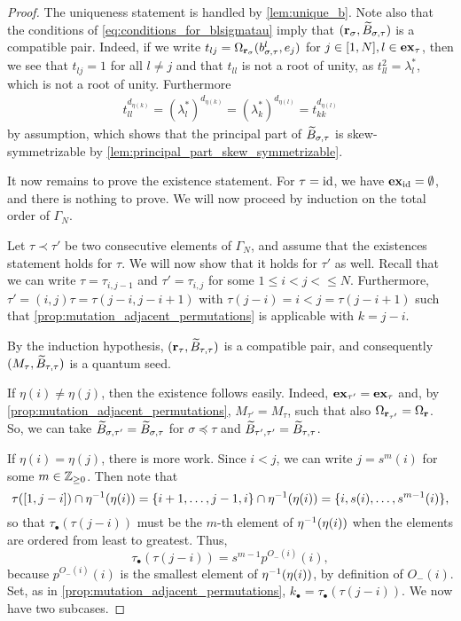 \begin{proof}

	The uniqueness statement is handled by \cref{lem:unique_b}. Note also that the
	conditions of \cref{eq:conditions_for_blsigmatau} imply that $(\mathbf{r}_\sigma,
		\widetilde{B}_{\sigma, \tau})$ is a compatible pair. Indeed, if we write $t_{lj} =
		\Omega_{\mathbf{r}_\sigma}(b^l_{\sigma, \tau}, e_j)$ for $j\in[1, N], l \in \mathbf{ex}_\tau$, then
	we see that $t_{lj} = 1$ for all $l \neq j$ and that $t_{ll}$ is not a root of unity,
	as $t_{ll}^2 = \lambda_l^*$, which is not a root of unity. Furthermore
	\begin{align*}
		t_{ll}^{d_{\eta(k)}}  = (\lambda^*_l)^{d_{\eta(k)}} = (\lambda^*_k)^{d_{\eta(l)}} = t_{kk}^{d_{\eta(l)}}
	\end{align*}
	by assumption, which shows that the principal part of $\widetilde{B}_{\sigma, \tau}$ is
	skew-symmetrizable by \cref{lem:principal_part_skew_symmetrizable}.

	It now remains to prove the existence statement. For $\tau = \operatorname{id}$, we have $\mathbf{ex}_{\operatorname{id}} =
		\emptyset$, and there is nothing to prove. We will now proceed by induction on the
	total order of $\Gamma_N$.

	Let $\tau \prec \tau'$ be two consecutive elements of $\Gamma_N$, and assume that the
	existences statement holds for $\tau$. We will now show that it holds for $\tau'$ as
	well. Recall that we can write $\tau = \tau_{i, j-1}$ and $\tau' = \tau_{i, j}$ for
	some $1 \leq i < j < \leq N$. Furthermore, $\tau' = (i, j)\tau = \tau(j-i, j-i+1)$ with
	$\tau(j-i) = i < j = \tau(j - i +1)$ such that
	\cref{prop:mutation_adjacent_permutations} is applicable with $k = j - i$.

	By the induction hypothesis, $(\mathbf{r}_\tau, \widetilde{B}_{\tau, \tau})$ is a compatible pair, and
	consequently $(M_\tau, \widetilde{B}_{\tau, \tau})$ is a quantum seed.

	If $\eta(i) \neq \eta(j)$, then the existence follows easily. Indeed, $\mathbf{ex}_{\tau'} =
		\mathbf{ex}_\tau$ and, by \cref{prop:mutation_adjacent_permutations}, $M_{\tau'} = M_\tau$,
	such that also $\Omega_{\mathbf{r}_{\tau'}} = \Omega_{\mathbf{r}}$. So, we can take $\widetilde{B}_{\sigma,
			\tau'} = \widetilde{B}_{\sigma, \tau}$ for $\sigma \preceq \tau$ and $\widetilde{B}_{\tau', \tau'} =
		\widetilde{B}_{\tau, \tau}$.

	If $\eta(i) = \eta(j)$, there is more work. Since $i < j$, we can write $j = s^m(i)$
	for some $m \in \mathbb{Z}_{\geq 0}$. Then note that
	\begin{equation*}
		\tau([1, j-i]) \cap \eta^{-1}(\eta(i)) = \{i+1, \dots, j-1, i\} \cap \eta^{-1}(\eta(i))= \{i, s(i), \dots, s^{m- 1}(i)\},
	\end{equation*}
	so that $\tau_\bullet(\tau(j-i))$ must be the $m$-th element of $\eta^{-1}(\eta(i))$
	when the elements are ordered from least to greatest. Thus,
	\begin{equation*}
		\tau_\bullet (\tau(j- i)) = s^{m-1}p^{O_{-}(i)}(i),
	\end{equation*}
	because $p^{O_{-}(i)}(i)$ is the smallest element of $\eta^{-1}(\eta(i))$, by definition of $O_{-}(i)$. Set, as in \cref{prop:mutation_adjacent_permutations}, $k_\bullet = \tau_\bullet(\tau(j - i))$. We now have two subcases.


\end{proof}
